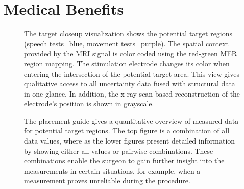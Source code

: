 \documentclass{egpubl}
\begin{document}
\section{Medical Benefits}\label{sec:benefits}
\begin{figure}[t]
  \centering
  \caption{The target closeup visualization shows the potential target regions (speech tests=blue, movement tests=purple). The spatial context provided by the MRI signal is color coded using the red-green MER region mapping. The stimulation electrode changes its color when entering the intersection of the potential target area. This view gives qualitative access to all uncertainty data fused with structural data in one glance. In addition, the x-ray scan based reconstruction of the electrode's position is shown in grayscale.}
  \label{fig:targetregion}
\end{figure}

\begin{figure}[t]
  \centering
  \caption{The placement guide gives a quantitative overview of measured data for potential target regions. The top figure is a combination of all data values, where as the lower figures present detailed information by showing either all values or pairwise combinations. These combinations enable the surgeon to gain further insight into the measurements in certain situations, for example, when a measurement proves unreliable during the procedure.}
  \label{fig:placementguide}
\end{figure}
\end{document}
